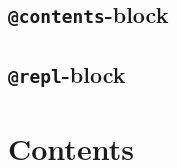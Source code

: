 \label{12317204655950454097}{}


\subsection{\texttt{@contents}-block}



\label{5495928211144802529}{}


\subsection{\texttt{@repl}-block}



\label{16839343392674353047}{}


\section{Contents}



\label{17095889498970318110}{}

